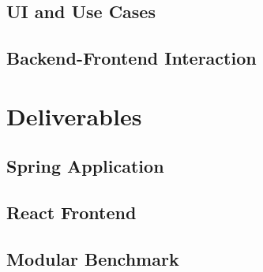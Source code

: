\documentclass[12pt, a4paper]{book}
\begin{document}
\section{UI and Use Cases}

\section{Backend-Frontend Interaction}

\chapter{Deliverables}

\section{Spring Application}

\section{React Frontend}

\section{Modular Benchmark}
\end{document}
